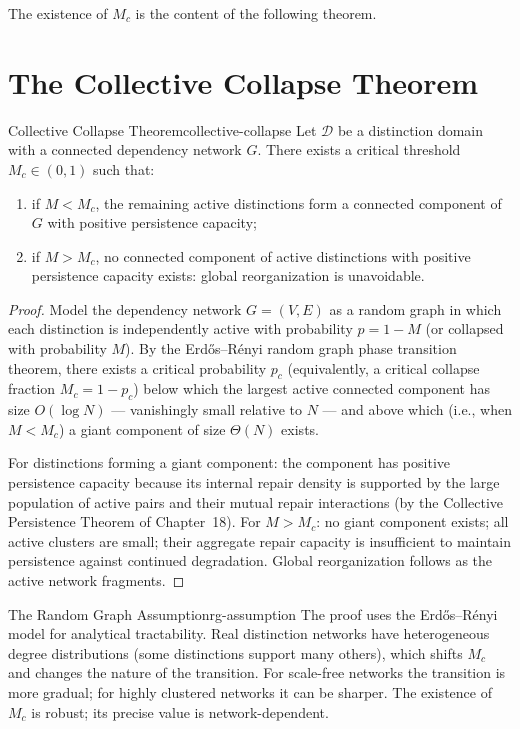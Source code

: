 \documentclass[12pt,twoside,openright]{book}
\providecommand{\distNet}{G}
\providecommand{\orderParam}{M}
\providecommand{\critThresh}{M_{c}}
\begin{document}
The existence of $\critThresh$ is the content of the following
theorem.

\section{The Collective Collapse Theorem}

\begin{theorem}{Collective Collapse Theorem}{collective-collapse}
Let $\mathcal{D}$ be a distinction domain with a connected
dependency network $\distNet$. There exists a critical threshold
$\critThresh\in(0,1)$ such that:
\begin{enumerate}[nosep,label=(\roman*)]
  \item if $\orderParam < \critThresh$, the remaining active
    distinctions form a connected component of $\distNet$ with
    positive persistence capacity;
  \item if $\orderParam > \critThresh$, no connected component
    of active distinctions with positive persistence capacity
    exists: global reorganization is unavoidable.
\end{enumerate}
\begin{proof}
Model the dependency network $\distNet=(V,E)$ as a random graph
in which each distinction is independently active with
probability $p=1-\orderParam$ (or collapsed with probability
$\orderParam$). By the Erd\H{o}s--R\'{e}nyi random graph
phase transition theorem, there exists a critical probability
$p_c$ (equivalently, a critical collapse fraction
$\critThresh=1-p_c$) below which the largest active connected
component has size $O(\log N)$ --- vanishingly small relative
to $N$ --- and above which (i.e., when $\orderParam<\critThresh$)
a giant component of size $\Theta(N)$ exists.

For distinctions forming a giant component: the component has
positive persistence capacity because its internal repair
density is supported by the large population of active pairs
and their mutual repair interactions (by the Collective
Persistence Theorem of Chapter~18). For $\orderParam>\critThresh$:
no giant component exists; all active clusters are small; their
aggregate repair capacity is insufficient to maintain persistence
against continued degradation. Global reorganization follows
as the active network fragments.
\end{proof}
\end{theorem}

\begin{remark}{The Random Graph Assumption}{rg-assumption}
The proof uses the Erd\H{o}s--R\'{e}nyi model for analytical
tractability. Real distinction networks have heterogeneous
degree distributions (some distinctions support many others),
which shifts $\critThresh$ and changes the nature of the
transition. For scale-free networks the transition is more
gradual; for highly clustered networks it can be sharper.
The existence of $\critThresh$ is robust; its precise value
is network-dependent.
\end{remark}
\end{document}
